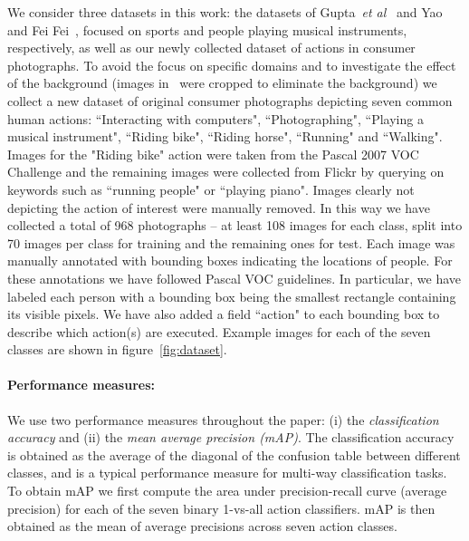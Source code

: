 \documentclass{bmvc2k}
\def\etal{\emph{et al}\bmvaOneDot}
\newcommand{\red}[1]{{\em \small \color{red} #1}} %
\newcommand{\green}[1]{#1} %
\newcommand{\parnspc}{\vspace*{-4.2mm}}     %
\begin{document}
We consider three datasets in this work:  the datasets of Gupta~\etal~\cite{Gupta09} and Yao and Fei Fei~\cite{FeiFei10a}, focused on sports and people playing musical instruments, respectively,  as well as  our newly collected dataset of actions in consumer photographs.  To avoid the focus on specific domains and to investigate the effect of the background (images in~\cite{Gupta09,FeiFei10a} were cropped to eliminate the background) we collect a new dataset of original consumer photographs depicting seven common human actions: ``Interacting with computers", ``Photographing", ``Playing a musical instrument", ``Riding bike", ``Riding horse", ``Running" and ``Walking".  Images for the \green{"Riding bike"} action were taken from the Pascal 2007 VOC Challenge and the remaining images were collected from Flickr by querying on keywords such as \green{``running people" or ``playing piano"}.  Images clearly not depicting the action of interest were manually removed. In this way we have collected a total of  968 photographs -- \green{at least 108} images for each class, split into \green{70 images per class} for training and \green{the remaining ones} for test. Each image was manually annotated with bounding boxes indicating the locations of people. %
For these annotations we have followed Pascal VOC guidelines. \green{In particular, we have labeled each person with a bounding box being the smallest rectangle containing its visible pixels. 
We have also added a field  ``action" to each bounding box to describe which action(s) are executed.} %
Example images for each of the seven classes are shown in figure~\ref{fig:dataset}.

\parnspc
\paragraph{Performance measures:}

We use two performance measures throughout the paper: (i) the {\em classification accuracy} and  (ii) the {\em mean average precision (mAP)}. The classification accuracy is obtained as the average of the diagonal of the confusion table between different classes, and is  a typical performance measure for multi-way classification tasks.
To obtain mAP we first compute the area under precision-recall curve (average precision) for each of the seven binary 1-vs-all action classifiers. mAP is then obtained as the mean of average precisions across seven action classes.
\end{document}
